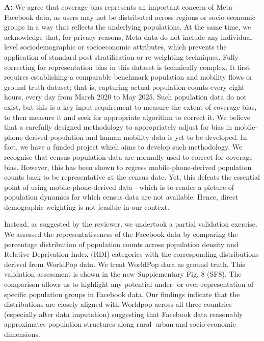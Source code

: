 \documentclass[12pt,a4paper,oneside, reqno]{amsart}
\begin{document}
\setlength{\leftskip}{1cm}\textbf{A:} We agree that coverage bias represents an important concern of Meta–Facebook data, as users may not be distributed across regions or socio-economic groups in a way that reflects the underlying populations. At the same time, we acknowledge that, for privacy reasons, Meta data do not include any individual-level sociodemographic or socioeconomic attributes, which prevents the application of standard post-stratification or re-weighting techniques. Fully correcting for representation bias in this dataset is technically complex. It first requires establishing a comparable benchmark population and mobility flows or ground truth dataset; that is, capturing actual population counts every eight hours, every day from March 2020 to May 2025. Such population data do not exist, but this is a key input requirement to measure the extent of coverage bias, to then measure it and seek for appropriate algorithm to correct it. We believe that a carefully designed methodology to appropriately adjust for bias in mobile-phone-derived population and human mobility data is yet to be developed. In fact, we have a funded project which aims to develop such methodology. We recognise that census population data are normally used to correct for coverage bias. However, this has been shown to regress mobile-phone-derived population counts back to be representative at the census date. Yet, this defeats the essential point of using mobile-phone-derived data - which is to render a picture of population dynamics for which census data are not available. Hence, direct demographic weighting is not feasible in our context. 

Instead, as suggested by the reviewer, we undertook a partial validation exercise. We assessed the representativeness of the Facebook data by comparing the percentage distribution of population counts across population density and Relative Deprivation Index (RDI) categories with the corresponding distributions derived from WorldPop data. We treat WorldPop dara as ground truth. This validation assessment is shown in the new Supplementary Fig. 8 (SF8). The comparison allows us to highlight any potential under- or over-representation of specific population groups in Facebook data. Our findings indicate that the distributions are closely aligned with Worldpop across all three countries (especially after data imputation) suggesting that Facebook data reasonably approximates population structures along rural–urban and socio-economic dimensions.
\end{document}
